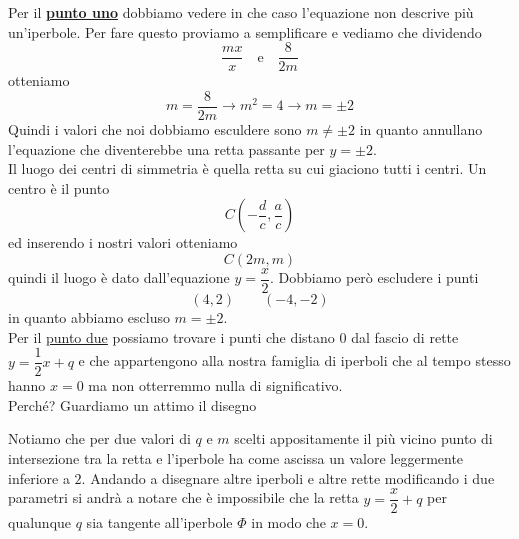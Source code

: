 Per il \hyperref[enum:ex:aff:2:1]{\textbf{punto uno}} dobbiamo vedere in che caso l'equazione non
descrive più un'iperbole. Per fare questo proviamo a semplificare e vediamo che dividendo
\begin{equation*}
  \frac{mx}{x} \quad \text{e} \quad \frac{8}{2m}
\end{equation*}
otteniamo
\begin{equation*}
  m = \frac{8}{2m} \rightarrow m^2 = 4 \rightarrow \boxed{m=\pm2}
\end{equation*}
Quindi i valori che noi dobbiamo esculdere sono $m\neq\pm2$ in quanto annullano l'equazione che
diventerebbe una retta passante per $y=\pm2$.\\
Il luogo dei centri di simmetria è quella retta su cui giaciono tutti i centri. Un centro è il punto
\begin{equation*}
  C\left(-\frac{d}{c},\frac{a}{c}\right)
\end{equation*}
ed inserendo i nostri valori otteniamo
\begin{equation*}
  C(2m,m)
\end{equation*}
quindi il luogo è dato dall'equazione $\boxed{y=\dfrac{x}{2}}$. Dobbiamo però escludere i punti
\begin{equation*}
  (4,2)\qquad(-4,-2)
\end{equation*}
in quanto abbiamo escluso $m=\pm2$.\\[\baselineskip]

Per il \hyperref[enum:ex:aff:2:2]{punto due} possiamo trovare i punti che distano $0$ dal fascio di
rette $y=\dfrac{1}{2}x+q$ e che appartengono alla nostra famiglia di iperboli che al tempo stesso
hanno $x=0$ ma non otterremmo nulla di significativo.\\
Perché? Guardiamo un attimo il disegno
\begin{center}
\end{center}
Notiamo che per due valori di $q$ e $m$ scelti appositamente il più vicino punto di intersezione tra 
la retta e l'iperbole ha come ascissa un valore leggermente inferiore a $2$. Andando a disegnare altre
iperboli e altre rette modificando i due parametri si andrà a notare che è impossibile che la retta
$y=\dfrac{x}{2}+q$ per qualunque $q$ sia tangente all'iperbole $\Phi$ in modo che $x=0$.\\[\baselineskip]


